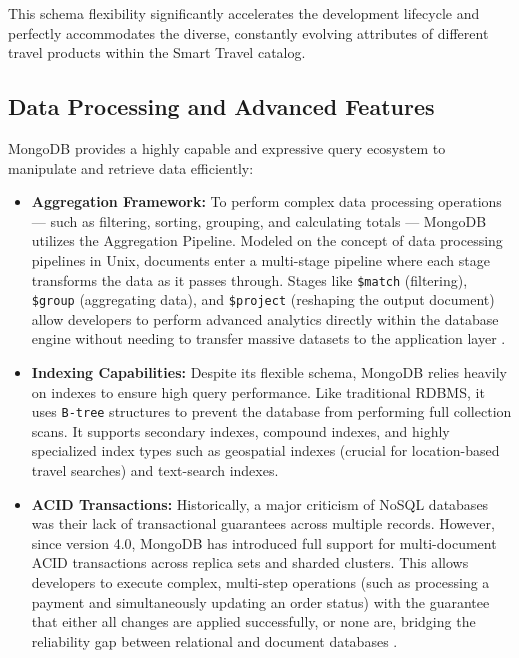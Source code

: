 This schema flexibility significantly accelerates the development lifecycle and perfectly accommodates the diverse, constantly evolving attributes of different travel products within the Smart Travel catalog.

\subsection{Data Processing and Advanced Features}

MongoDB provides a highly capable and expressive query ecosystem to manipulate and retrieve data efficiently:

\begin{itemize}
    \item \textbf{Aggregation Framework:} To perform complex data processing operations — such as filtering, sorting, grouping, and calculating totals — MongoDB utilizes the Aggregation Pipeline. Modeled on the concept of data processing pipelines in Unix, documents enter a multi-stage pipeline where each stage transforms the data as it passes through. Stages like \texttt{\$match} (filtering), \texttt{\$group} (aggregating data), and \texttt{\$project} (reshaping the output document) allow developers to perform advanced analytics directly within the database engine without needing to transfer massive datasets to the application layer \cite{mongodb_aggregation}.
     
    \item \textbf{Indexing Capabilities:} Despite its flexible schema, MongoDB relies heavily on indexes to ensure high query performance. Like traditional RDBMS, it uses \texttt{B-tree} structures to prevent the database from performing full collection scans. It supports secondary indexes, compound indexes, and highly specialized index types such as geospatial indexes (crucial for location-based travel searches) and text-search indexes.
    
    \item \textbf{ACID Transactions:} Historically, a major criticism of NoSQL databases was their lack of transactional guarantees across multiple records. However, since version 4.0, MongoDB has introduced full support for multi-document \gls{ACID} transactions across replica sets and sharded clusters. This allows developers to execute complex, multi-step operations (such as processing a payment and simultaneously updating an order status) with the guarantee that either all changes are applied successfully, or none are, bridging the reliability gap between relational and document databases \cite{mongodb_transactions}.
\end{itemize}

